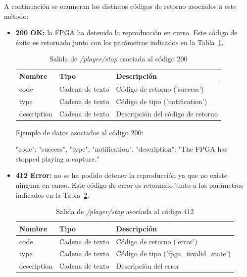A continuación se enumeran los distintos códigos de retorno asociados a este método:
\begin{itemize}

\item{\textbf{200 OK:} la \gls{FPGA} ha detenido la reproducción en curso.
Este código de éxito es retornado junto con los parámetros indicados en la Tabla~\ref{extra:api:playerstop:ok}.
\begin{table}[H]
\centering
\begin{tabular}{|l|l|l|}
\hline
\rowcolor[HTML]{F5F5F5}
\textbf{Nombre}  & \textbf{Tipo}   & \textbf{Descripción}              \\ \hline
code             & Cadena de texto & Código de retorno ('success')     \\ \hline
type             & Cadena de texto & Código de tipo ('notification')   \\ \hline
description      & Cadena de texto & Descripción del código de retorno \\ \hline
\end{tabular}
\caption{Salida de \textit{/player/stop} asociada al código 200}
\label{extra:api:playerstop:ok}
\end{table}
\begin{minipage}{\textwidth}
Ejemplo de datos asociados al código 200:

\begin{code}[language=json]
{
  "code": "success",
  "type": "notification",
  "description": "The FPGA has stopped playing a capture."
}
\end{code}
\end{minipage}
}

\item{\textbf{412 Error:} no se ha podido detener la reproducción ya que no existe ninguna en curso.
Este código de error es retornado junto a los parámetros indicados en la Tabla~\ref{extra:api:playerstop:error}.
\begin{table}[H]
\centering
\begin{tabular}{|l|l|l|}
\hline
\rowcolor[HTML]{F5F5F5}
\textbf{Nombre}  & \textbf{Tipo}   & \textbf{Descripción}                    \\ \hline
code             & Cadena de texto & Código de retorno ('error')             \\ \hline
type             & Cadena de texto & Código de tipo ('fpga\_invalid\_state') \\ \hline
description      & Cadena de texto & Descripción del error                   \\ \hline
\end{tabular}
\caption{Salida de \textit{/player/stop} asociada al código 412}
\label{extra:api:playerstop:error}
\end{table}

}
\end{itemize}
